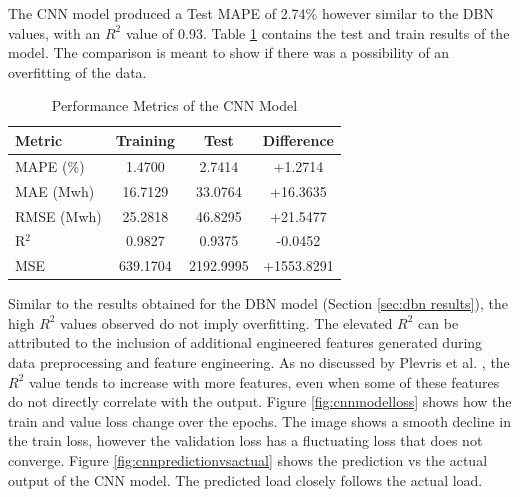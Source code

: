  The CNN model produced a Test MAPE of 2.74\% however similar to the DBN values, with an $R^2$ value of 0.93. Table \ref{tab:cnn_performance_diff} contains the test and train results of the model. The comparison is meant to show if there was a possibility of an overfitting of the data.
 \begin{table}[h]
 	\centering
 	\caption{Performance Metrics of the CNN Model}
 	\label{tab:cnn_performance_diff}
 	\begin{tabular}{lccc}
 		\hline
 		\textbf{Metric} & \textbf{Training} & \textbf{Test} & \textbf{Difference} \\
 		\hline
 		MAPE (\%) & 1.4700 & 2.7414 & +1.2714 \\
 		MAE (Mwh) & 16.7129 & 33.0764 & +16.3635 \\
 		RMSE (Mwh) & 25.2818 & 46.8295 & +21.5477 \\
 		R$^2$ & 0.9827 & 0.9375 & -0.0452 \\
 		MSE & 639.1704 & 2192.9995 & +1553.8291 \\
 		\hline
 	\end{tabular}
 \end{table}
Similar to the results obtained for the DBN model (Section \ref{sec:dbn results}), the high $R^2$ values observed do not imply overfitting. The elevated $R^2$ can be attributed to the inclusion of additional engineered features generated during data preprocessing and feature engineering. As no discussed by Plevris et al. \cite{plevris2022investigation}, the $R^2$ value tends to increase with more features, even when some of these features do not directly correlate with the  output. Figure \ref{fig:cnnmodelloss} shows how the train and value loss change over the epochs. The image shows a smooth decline in the train loss, however the validation loss has a fluctuating loss that does not converge.
Figure \ref{fig:cnnpredictionvsactual} shows the prediction vs the actual output of the CNN model. The predicted load closely follows the actual load.
